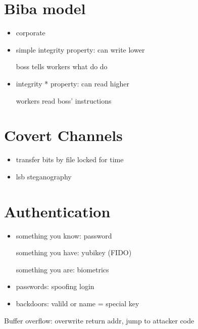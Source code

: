 \documentclass[11pt]{article}
\begin{document}
\section{Biba model}
\begin{itemize}
    \item corporate
    \item simple integrity property: can write lower

        boss tells workers what do do

    \item integrity * property: can read higher 

        workers read boss' instructions
\end{itemize}


\section{Covert Channels}
\begin{itemize}
    \item transfer bits by file locked for time
    \item lsb steganography
\end{itemize}


\section{Authentication}
\begin{itemize}
    \item something you know: password

        something you have: yubikey (FIDO)

        something you are: biometrics

    \item passwords: spoofing login

    \item backdoors: valild or name = special key
\end{itemize}

Buffer overflow: overwrite return addr, jump to attacker code
\end{document}
